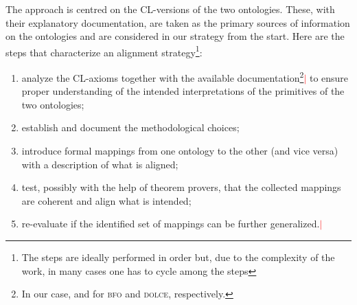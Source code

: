 \documentclass[ao]{iosart2x}
\newcommand{\nb}[1]{\textcolor{red}{$|$}\marginpar{\hspace*{-0cm}\parbox{20mm}{\scriptsize\raggedright\textcolor{red}{#1}}}}
\newcommand{\dolce}{{\textsc{dolce}}}
\newcommand{\bfo}{{\textsc{bfo}}}
\begin{document}
The approach is centred on the CL-versions of the two ontologies. These, with their explanatory documentation, are taken as the primary sources of information on the ontologies and are considered in our strategy from the start. 
Here are the steps that characterize an alignment strategy\footnote{The steps are ideally performed in order but, due to the complexity of the work, in many cases one has to cycle among the steps}:
\begin{enumerate}[({\bf S}1)]
\item analyze the CL-axioms together with the available documentation\footnote{In our case, \cite{barryBasicFormalOntology2015} and \cite{D18} for {\bfo} and {\dolce}, respectively.}\nb{CM: cambiare  il rif. alla versione aggiornata che spiega BFO 2020} to ensure proper understanding of the intended interpretations of the primitives of the two ontologies; %
 \item establish and document the methodological choices;
\item introduce formal mappings from one ontology to the other (and vice versa) with a description of what is aligned;
\item test, possibly with the help of theorem provers, that the collected mappings are coherent and align what is intended;
\item re-evaluate if the identified set of mappings can be further generalized.\nb{SB: ho aggiunto, è sensato?}
\end{enumerate}
\end{document}
